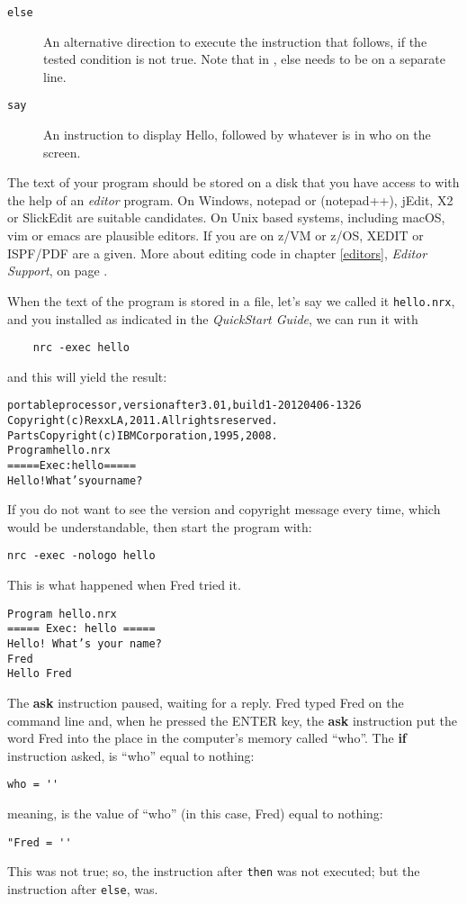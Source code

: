 {\begin{description}
\item [\texttt{else}] An alternative direction to execute the
  instruction that follows, if the tested condition is not true. Note
  that in \nr{}, else needs to be on a separate line.
\item [\texttt{say}] An instruction to display Hello, followed by whatever is in who on the screen.
\end{description}
The text of your program should be stored on a disk that you have
access to with the help of an \emph{editor} program. On Windows,
notepad or (notepad++), jEdit, X2 or SlickEdit are suitable
candidates. On Unix based systems, including macOS, vim or emacs are
plausible editors. If you are on z/VM or z/OS, XEDIT or ISPF/PDF are a
given. More about editing \nr{} code in chapter \ref{editors},
\emph{Editor Support}, on page \pageref{editors}. 

When the text of the program is stored in a file, let's say we called
it \texttt{hello.nrx}, and you installed \nr{} as indicated in the
\emph{\nr{} QuickStart Guide}, we can run it with
\begin{verbatim}
    nrc -exec hello
\end{verbatim}
and this will yield the result:
\begin{alltt}
\nr{} portable processor, version \nr{} after3.01, build 1-20120406-1326
Copyright (c) RexxLA, 2011.  All rights reserved.
Parts Copyright (c) IBM Corporation, 1995,2008.
Program hello.nrx
===== Exec: hello =====
Hello! What’s your name?
\end{alltt}
If you do not want to see the version and copyright message every
time, which would be understandable, then start the program with:
\begin{verbatim}
nrc -exec -nologo hello
\end{verbatim}
This is what happened when Fred tried it.
\begin{verbatim}
Program hello.nrx
===== Exec: hello =====
Hello! What’s your name?
Fred
Hello Fred
\end{verbatim}
The \textbf{ask} instruction paused, waiting for a reply. Fred typed
Fred on the command line and, when he pressed the ENTER key, the
\textbf{ask} instruction put the word Fred into the place in the
computer's memory called ``who''. The \textbf{if} instruction asked,
is ``who'' equal to nothing:
\begin{verbatim}
who = '' 
\end{verbatim}
meaning, is the value of ``who''  (in this case, Fred) equal to
nothing:
\begin{verbatim}
"Fred = ''
\end{verbatim}
This was not true; so, the instruction after \texttt{then} was not executed; but the instruction
after \texttt{else}, was.

}
